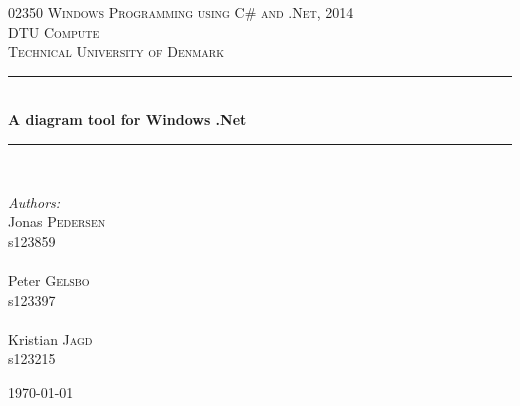 \documentclass[10pt,a4paper]{report}
\newcommand{\HRule}{\rule{\linewidth}{0.5mm}}
\begin{document}
\begin{titlepage}
\begin{center}


\textsc{\Large 02350 Windows Programming using C# and .Net, 2014\\ 
DTU Compute \\ 
Technical University of Denmark}\\[1.5cm]

\HRule \\[0.4cm]
{ \huge \bfseries A diagram tool for Windows .Net \\[0.4cm] }

\HRule \\[1.5cm]

\begin{center}
\begin{minipage}{0.5\textwidth}
\begin{flushleft} \large
\emph{Authors:}\\
Jonas \textsc{Pedersen} \\
s123859 \\ ~ \\
Peter \textsc{Gelsbo} \\
s123397 \\ ~\\
Kristian \textsc{Jagd} \\
s123215
\end{flushleft}
\end{minipage}
\end{center}



\vfill

{\large \today}

\end{center}
\end{titlepage}



    

\thispagestyle{empty}


\cleardoublepage






\tableofcontents
\end{document}
